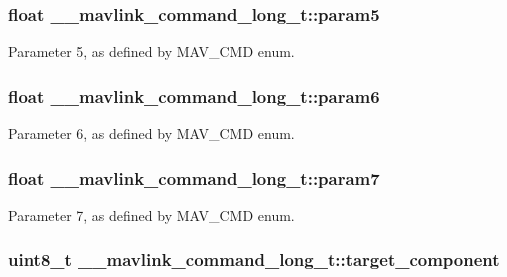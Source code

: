 \hypertarget{struct____mavlink__command__long__t_a9c74f309b82fed5527bf1e7732424f21}{
\subsubsection[{param5}]{\setlength{\rightskip}{0pt plus 5cm}float \+\_\+\+\_\+mavlink\+\_\+command\+\_\+long\+\_\+t\+::param5}}\label{struct____mavlink__command__long__t_a9c74f309b82fed5527bf1e7732424f21}


Parameter 5, as defined by M\+A\+V\+\_\+\+C\+M\+D enum. 

\hypertarget{struct____mavlink__command__long__t_ad75daa212f56fd47cd0956f8dc4fdbd5}{
\subsubsection[{param6}]{\setlength{\rightskip}{0pt plus 5cm}float \+\_\+\+\_\+mavlink\+\_\+command\+\_\+long\+\_\+t\+::param6}}\label{struct____mavlink__command__long__t_ad75daa212f56fd47cd0956f8dc4fdbd5}


Parameter 6, as defined by M\+A\+V\+\_\+\+C\+M\+D enum. 

\hypertarget{struct____mavlink__command__long__t_a1bf675e543b14770e7c410adb9d3d21e}{
\subsubsection[{param7}]{\setlength{\rightskip}{0pt plus 5cm}float \+\_\+\+\_\+mavlink\+\_\+command\+\_\+long\+\_\+t\+::param7}}\label{struct____mavlink__command__long__t_a1bf675e543b14770e7c410adb9d3d21e}


Parameter 7, as defined by M\+A\+V\+\_\+\+C\+M\+D enum. 

\hypertarget{struct____mavlink__command__long__t_ab2e28f55169c5076999e2c941bafce39}{
\subsubsection[{target\+\_\+component}]{\setlength{\rightskip}{0pt plus 5cm}uint8\+\_\+t \+\_\+\+\_\+mavlink\+\_\+command\+\_\+long\+\_\+t\+::target\+\_\+component}}\label{struct____mavlink__command__long__t_ab2e28f55169c5076999e2c941bafce39}


